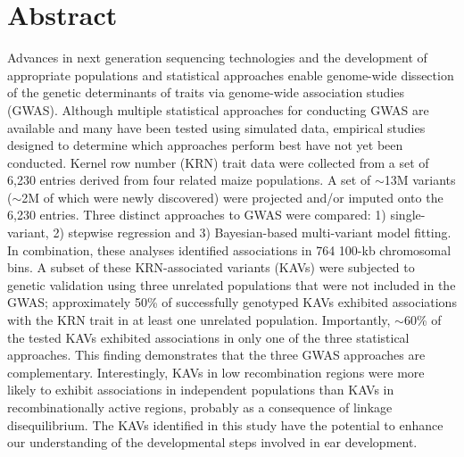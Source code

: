 \documentclass[10pt,letterpaper]{article}
\begin{document}

\section*{Abstract}
Advances in next generation sequencing technologies and the development of appropriate populations and statistical approaches enable genome-wide dissection of the genetic determinants of traits via genome-wide association studies (GWAS). Although multiple statistical approaches for conducting GWAS are available and many have been tested using simulated data, empirical studies designed to determine which approaches perform best have not yet been conducted. Kernel row number (KRN) trait data were collected from a set of 6,230 entries derived from four related maize populations. A set of $\sim$13M variants ($\sim$2M of which were newly discovered) were projected and/or imputed onto the 6,230 entries. Three distinct approaches to GWAS were compared: 1) single-variant, 2) stepwise regression and 3) Bayesian-based multi-variant model fitting. In combination, these analyses identified associations in 764 100-kb chromosomal bins. A subset of these KRN-associated variants (KAVs) were subjected to genetic validation using three unrelated populations that were not included in the GWAS; approximately 50\% of successfully genotyped KAVs exhibited associations with the KRN trait in at least one unrelated population. Importantly, $\sim$60\% of the tested KAVs exhibited associations in only one of the three statistical approaches. This finding demonstrates that the three GWAS approaches are complementary. Interestingly, KAVs in low recombination regions were more likely to exhibit associations in independent populations than KAVs in recombinationally active regions, probably as a consequence of linkage disequilibrium. The KAVs identified in this study have the potential to enhance our understanding of the developmental steps involved in ear development.

\end{document}
